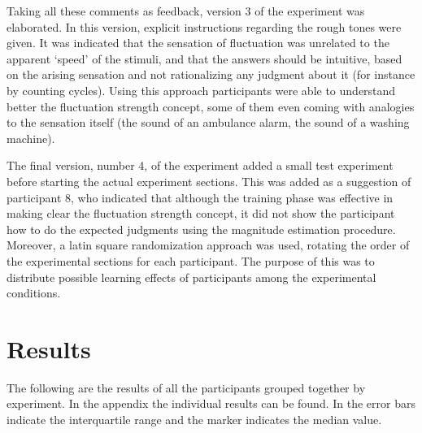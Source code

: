 \documentclass[../main.tex]{subfiles}
\begin{document}
Taking all these comments as feedback, version 3 of the experiment was
elaborated. In this version, explicit instructions regarding the rough tones
were given. It was indicated that the sensation of fluctuation was unrelated to
the apparent `speed' of the stimuli, and that the answers should be intuitive,
based on the arising sensation and not rationalizing any judgment about it
(for instance by counting cycles). Using this approach participants were able to
understand better the fluctuation strength concept, some of them even coming
with analogies to the sensation itself (the sound of an ambulance alarm, the
sound of a washing machine).

The final version, number 4, of the experiment added a small test experiment
before starting the actual experiment sections. This was added as a suggestion
of participant 8, who indicated that although the training phase was effective
in making clear the fluctuation strength concept, it did not show the
participant how to do the expected judgments using the magnitude estimation
procedure. Moreover, a latin square randomization approach was used, rotating
the order of the experimental sections for each participant. The purpose of this
was to distribute possible learning effects of participants among the
experimental conditions.

\section{Results}

The following are the results of all the participants grouped together by
experiment. In the appendix the individual results can be found. In
 the error bars
indicate the interquartile range and the marker indicates the median value.
\end{document}
